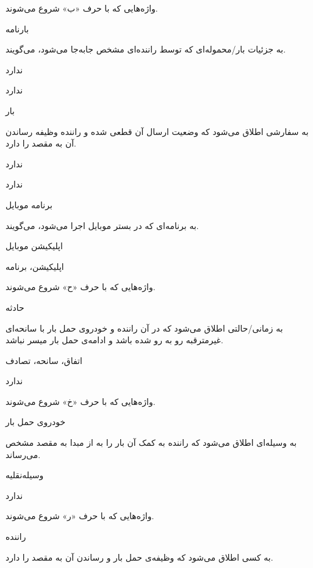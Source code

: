
واژه‌هایی که با حرف «ب» شروع می‌شوند.
\noindent \hrulefill

بارنامه

به جزئیات بار/محموله‌ای که توسط راننده‌ای مشخص جا‌به‌جا می‌شود، می‌گویند.

ندارد

ندارد

\noindent \hrulefill

بار

به سفارشی اطلاق می‌شود که وضعیت ارسال آن قطعی شده و راننده وظیفه رساندن آن به مقصد را دارد.

ندارد

ندارد

\noindent \hrulefill


برنامه موبایل

به برنامه‌ای که در بستر موبایل اجرا می‌شود، می‌گویند.

اپلیکیشن موبایل

اپلیکیشن، برنامه

\newpage

 واژه‌هایی که با حرف «ح» شروع می‌شوند.
 \noindent \hrulefill
 
حادثه

به زمانی/حالتی اطلاق می‌شود که در آن راننده و خودروی حمل بار با سانحه‌ای غیرمترقبه رو به رو شده باشد و ادامه‌ی حمل بار میسر نباشد.

 اتفاق، سانحه،‌ تصادف

 ندارد

\newpage

واژه‌هایی که با حرف «خ» شروع می‌شوند.
\noindent \hrulefill

خودروی حمل بار

به وسیله‌ای اطلاق می‌شود که راننده به کمک آن بار را به از مبدا به مقصد مشخص می‌رساند.

وسیله‌نقلیه

ندارد

\newpage

واژه‌هایی که با حرف «ر» شروع می‌شوند.
\noindent \hrulefill

راننده

به کسی اطلاق می‌شود که وظیفه‌ی حمل بار و رساندن آن به مقصد را دارد.

